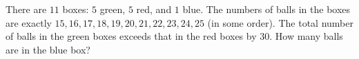 There are $11$ boxes: $5$ green, $5$ red, and $1$ blue. The numbers of balls in the boxes are exactly $15, 16, 17, 18, 19, 20, 21, 22, 23, 24, 25$ (in some order). The total number of balls in the green boxes exceeds that in the red boxes by $30$. How many balls are in the blue box?
